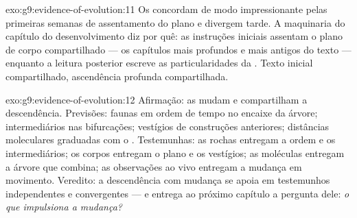 \begin{solution}{exo:g9:evidence-of-evolution:11}
Os   concordam de modo impressionante
pelas primeiras semanas de assentamento do plano e divergem
tarde. A maquinaria do capítulo do desenvolvimento diz por
quê: as instruções iniciais assentam o plano de corpo
compartilhado --- os capítulos mais profundos e mais antigos
do texto --- enquanto a leitura posterior escreve as
particularidades da . Texto inicial compartilhado,
ascendência profunda compartilhada.
\end{solution}

\begin{solution}{exo:g9:evidence-of-evolution:12}
Afirmação: as  mudam e compartilham a descendência.
Previsões: faunas em ordem de tempo no encaixe da árvore;
intermediários nas bifurcações; vestígios de construções
anteriores; distâncias moleculares graduadas com o
. Testemunhas: as rochas entregam a ordem e os
intermediários; os corpos entregam o plano e os vestígios; as
moléculas entregam a árvore que combina; as observações ao
vivo entregam a mudança em movimento. Veredito: a
descendência com mudança se apoia em testemunhos
independentes e convergentes --- e entrega ao próximo
capítulo a pergunta dele: \emph{o que impulsiona a mudança?}
\end{solution}

